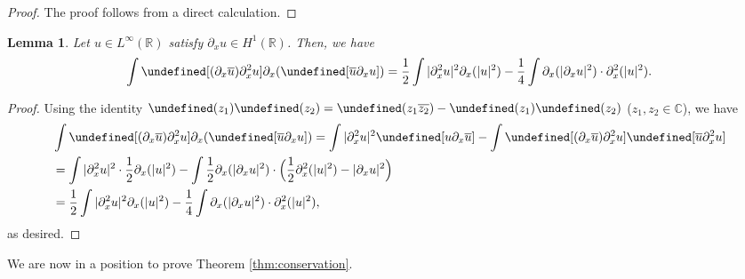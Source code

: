 \documentclass{amsart}
\newtheorem{lemma}[proposition]{Lemma}
\numberwithin{equation}{section}
\newcommand{\R}{\mathbb{R}}
\let\Re=\undefined\DeclareMathOperator{\Re}{Re}
\let\Im=\undefined\DeclareMathOperator{\Im}{Im}
\begin{document}
\begin{proof}
The proof follows from a direct calculation.
\end{proof}


\begin{lemma}\label{lem:ImIm}
Let $u\in L^\infty(\R)$ satisfy $\partial_xu\in H^1(\R)$.
Then, we have
\[ \int \Im [(\partial_x\overline{u})\partial_x^2u] \partial_x(\Im [\overline{u}\partial_xu])
=\frac12\int |\partial_x^2u|^2\partial_x(|u|^2) -\frac14\int \partial_x(|\partial_xu|^2)\cdot \partial_x^2(|u|^2) .\]
\end{lemma}
\begin{proof}
Using the identity $\Im(z_1)\Im(z_2)=\Re(z_1\overline{z_2})-\Re(z_1)\Re(z_2)$ ($z_1,z_2\in \mathbb{C}$), we have
\begin{align*}
&\int \Im [(\partial_x\overline{u})\partial_x^2u] \partial_x(\Im [\overline{u}\partial_xu]) =\int |\partial_x^2u|^2\Re [u\partial_x\overline{u}] -\int \Re[(\partial_x\overline{u})\partial_x^2u] \Re [\overline{u}\partial_x^2u] \\
&=\int |\partial_x^2u|^2\cdot \frac12\partial_x(|u|^2) -\int \frac12 \partial_x(|\partial_xu|^2)\cdot \Big( \frac12 \partial_x^2(|u|^2)-|\partial_xu|^2\Big) \\
&=\frac12\int |\partial_x^2u|^2\partial_x(|u|^2) -\frac14\int \partial_x(|\partial_xu|^2)\cdot \partial_x^2(|u|^2) ,
\end{align*}
as desired.
\end{proof}


\medskip
We are now in a position to prove Theorem \ref{thm:conservation}. 
\end{document}
